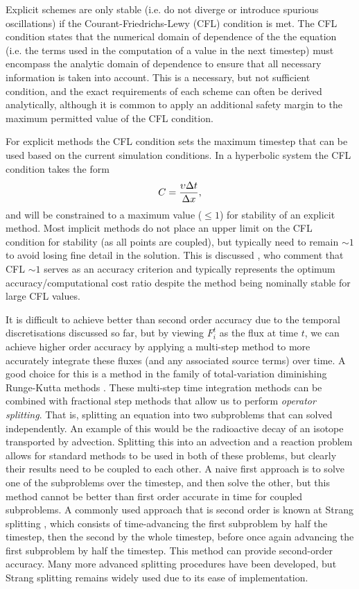 Explicit schemes are only stable (i.e. do not diverge or introduce spurious oscillations) if the Courant-Friedrichs-Lewy (CFL) condition is met.
The CFL condition states that the numerical domain of dependence of the the equation (i.e. the terms used in the computation of a value in the next timestep) must encompass the analytic domain of dependence to ensure that all necessary information is taken into account.
This is a necessary, but not sufficient condition, and the exact requirements of each scheme can often be derived analytically, although it is common to apply an additional safety margin to the maximum permitted value of the CFL condition.

For explicit methods the CFL condition sets the maximum timestep that can be used based on the current simulation conditions.
In a hyperbolic system the CFL condition takes the form
\begin{equation}
    C = \frac{\upsilon\Delta t}{\Delta x},
\end{equation}
and will be constrained to a maximum value ($\leq 1$) for stability of an explicit method.
Most implicit methods do not place an upper limit on the CFL condition for stability (as all points are coupled), but typically need to remain $\sim 1$ to avoid losing fine detail in the solution.
This is discussed \citet{Viallet2011}, who comment that CFL $\sim 1$ serves as an accuracy criterion and typically represents the optimum accuracy/computational cost ratio despite the method being nominally stable for large CFL values.

It is difficult to achieve better than second order accuracy due to the temporal discretisations discussed so far, but by viewing $F_i^t$ as the flux at time $t$, we can achieve higher order accuracy by applying a multi-step method to more accurately integrate these fluxes (and any associated source terms) over time.
A good choice for this is a method in the family of total-variation diminishing Runge-Kutta methods \citep[e.g.][]{Shu1988}.
These multi-step time integration methods can be combined with fractional step methods that allow us to perform \emph{operator splitting}.
That is, splitting an equation into two subproblems that can solved independently.
An example of this would be the radioactive decay of an isotope transported by advection.
Splitting this into an advection and a reaction problem allows for standard methods to be used in both of these problems, but clearly their results need to be coupled to each other.
A naive first approach is to solve one of the subproblems over the timestep, and then solve the other, but this method cannot be better than first order accurate in time for coupled subproblems.
A commonly used approach that is second order is known at Strang splitting \citep{Strang1968}, which consists of time-advancing the first subproblem by half the timestep, then the second by the whole timestep, before once again advancing the first subproblem by half the timestep.
This method can provide second-order accuracy.
Many more advanced splitting procedures have been developed, but Strang splitting remains widely used due to its ease of implementation.

